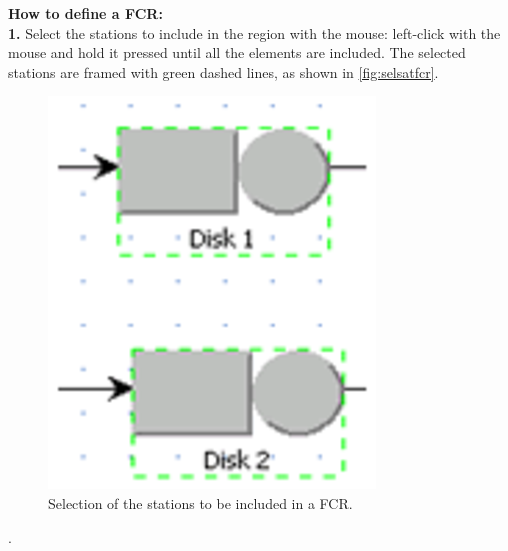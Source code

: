 \textbf{How to define a FCR:}\\
\textbf{ 1.}  Select the stations to include in the region with
the mouse: left-click with the mouse and hold it pressed until all
the elements are included. The selected stations are framed with
green dashed lines, as shown in \autoref{fig:selsatfcr}.\\
\begin{figure}[h]
    \begin{center}
        \includegraphics[scale=.5]{img/jsimg/8.1.eps}
    \end{center}
    \caption{Selection of the stations to be included in a FCR.}
    \label{fig:selsatfcr}
\end{figure}
.\\
